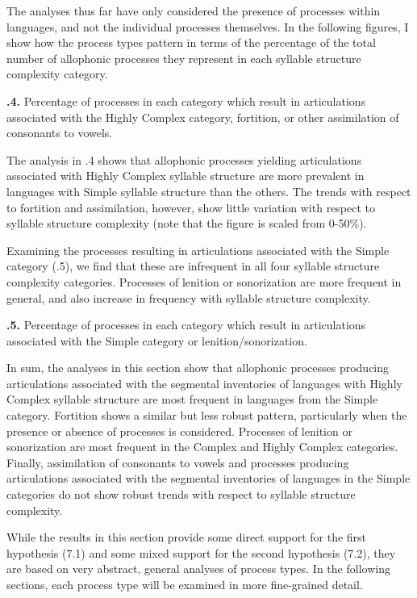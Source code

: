   The analyses thus far have only considered the presence of processes within languages, and not the individual processes themselves. In the following figures, I show how the process types pattern in terms of the percentage of the total number of allophonic processes they represent in each syllable structure complexity category.

\textbf{.4.} Percentage of processes in each category which result in articulations associated with the Highly Complex category, fortition, or other assimilation of consonants to vowels.

  The analysis in .4 shows that allophonic processes yielding articulations associated with Highly Complex syllable structure are more prevalent in languages with Simple syllable structure than the others. The trends with respect to fortition and assimilation, however, show little variation with respect to syllable structure complexity (note that the figure is scaled from 0-50\%).

  Examining the processes resulting in articulations associated with the Simple category (.5), we find that these are infrequent in all four syllable structure complexity categories. Processes of lenition or sonorization are more frequent in general, and also increase in frequency with syllable structure complexity.

\textbf{.5.} Percentage of processes in each category which result in articulations associated with the Simple category or lenition/sonorization.

  In sum, the analyses in this section show that allophonic processes producing articulations associated with the segmental inventories of languages with Highly Complex syllable structure are most frequent in languages from the Simple category. Fortition shows a similar but less robust pattern, particularly when the presence or absence of processes is considered. Processes of lenition or sonorization are most frequent in the Complex and Highly Complex categories. Finally, assimilation of consonants to vowels and processes producing articulations associated with the segmental inventories of languages in the Simple categories do not show robust trends with respect to syllable structure complexity.

  While the results in this section provide some direct support for the first hypothesis (7.1) and some mixed support for the second hypothesis (7.2), they are based on very abstract, general analyses of process types. In the following sections, each process type will be examined in more fine-grained detail.

